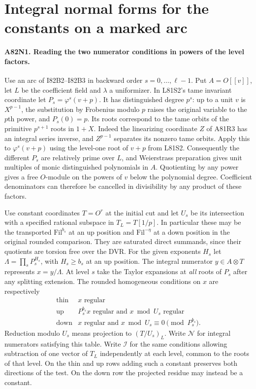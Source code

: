 \section{Integral normal forms for the constants on a marked arc}

\paragraph{A82N1. Reading the two numerator conditions in powers of the level factors.}
Use an arc of I82B2--I82B3 in backward order $s=0,\ldots,\ell-1$.
Put $A=O[[v]]$, let $L$ be the coefficient field and $\lambda$ a
uniformizer. In L81S2's tame invariant coordinate let
$P_s=\varphi^s(v+p)$. It has distinguished degree $p^s$:
up to a unit $v$ is $X^{p-1}$, the substitution by Frobenius
modulo $p$ raises the original variable to the $p$th power, and
$P_s(0)=p$. Its roots correspond to the tame orbits of the
primitive $p^{s+1}$ roots in $1+X$. Indeed the linearizing
coordinate $Z$ of A81R3 has an integral series inverse, and
$Z^{p-1}$ separates its nonzero tame orbits. Apply this to
$\varphi^s(v+p)$ using the level-one root of $v+p$ from L81S2.
Consequently the different $P_s$ are relatively prime over $L$,
and Weierstrass preparation gives unit multiples of monic
distinguished polynomials in $A$. Quotienting by any power gives
a free $O$-module on the powers of $v$ below the polynomial
degree. Coefficient denominators can therefore be cancelled in
divisibility by any product of these factors.

Use constant coordinates $T=O^r$ at the initial cut and let
$U_s$ be its intersection with a specified rational subspace
in $T_L=T[1/p]$. In particular these may be the transported
$\mathrm{Fil}^{b_s}$ at an up position and $\mathrm{Fil}^{-\eta}$
at a down position in the original rounded comparison.
They are saturated direct summands, since their quotients are
torsion free over the DVR. For the given exponents $H_s$ let
$\Lambda=\prod_sP_s^{H_s}$, with $H_s\ge b_s$ at an up
position. The integral numerator $y\in A\otimes T$ represents
$x=y/\Lambda$. At level $s$ take the Taylor expansions at
\emph{all} roots of $P_s$ after any splitting extension. The
rounded homogeneous conditions on $x$ are respectively
\[
 \begin{array}{c|l}
 \text{thin}&x\text{ regular}\\
 \text{up}&P_s^{b_s}x\text{ regular and }x\bmod U_s
                                        \text{ regular}\\
 \text{down}&x\text{ regular and }x\bmod U_s
                                      \equiv0\pmod{P_s^{b_s}} .
 \end{array}
\]
Reduction modulo $U_s$ means projection to $(T/U_s)_L$.
Write $\mathcal N$ for integral numerators satisfying this table.
Write $\mathcal I$ for the same conditions allowing subtraction
of one vector of $T_L$ independently at each level, common to
the roots of that level. On the thin and up rows adding such a
constant preserves both directions of the test. On the down
row the projected residue may instead be a constant.

